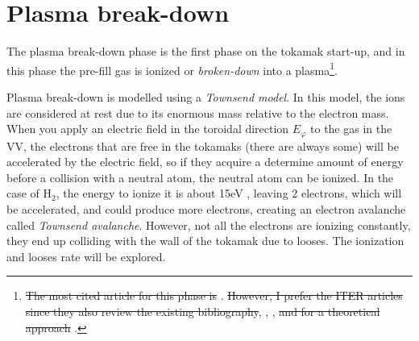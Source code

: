 \documentclass[a4paper,12pt,oneside]{book}
\begin{document}
\section{Plasma break-down}
\label{sec_breakdown}
The plasma break-down phase \cite{Lloyd_1991, ITER_1999, ITER_2007, ITER_2019} is the first phase on the tokamak start-up, and in this phase the pre-fill gas is ionized or \textit{broken-down} into a plasma\footnote{\st{The most cited article for this phase is} \cite{Lloyd_1991}. \st{However, I prefer the ITER articles since they also review the existing bibliography}, \cite{ITER_1999}, \cite{ITER_2007}, \st{and for a theoretical approach} \cite{ITER_2019}.}.

Plasma break-down is modelled using a \textit{Townsend model}. In this model, the ions are considered at rest due to its enormous mass relative to the electron mass. When you apply an electric field in the toroidal direction $E_\varphi$ to the gas in the VV, the electrons that are free in the tokamaks (there are always some) will be accelerated by the electric field, so if they acquire a determine amount of energy before a collision with a neutral atom, the neutral atom can be ionized. In the case of H$_2$, the energy to ionize it is about 15eV \cite{ITER_2019}, leaving 2 electrons, which will be accelerated, and could produce more electrons, creating an electron avalanche called \textit{Townsend avalanche}. However, not all the electrons are ionizing constantly, they end up colliding with the wall of the tokamak due to looses. The ionization and looses rate will be explored.
%
\end{document}
